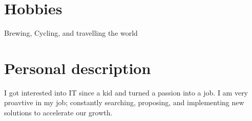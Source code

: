 \documentclass[]{template/friggeri-cv} %
\begin{document}

\section{Hobbies}

{Brewing, Cycling, and travelling the world}

\section{Personal description}
        {
          I got interested into IT since a kid and turned a passion into a job.
          I am very proavtive in my job; constantly searching, proposing, and implementing new solutions to accelerate our growth.
        }
\end{document}
